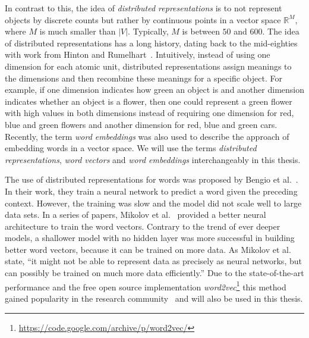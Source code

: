\documentclass[
        a4paper,
        titlepage,
        twoside,
        parskip,
        numbers=noenddot
        ]{scrbook}
\theoremstyle{break}
\begin{document}
In contrast to this, the idea of \emph{distributed representations} is to not represent objects by discrete counts but rather by continuous points in a vector space $\mathbb{R}^M$, where $M$ is much smaller than $|V|$.
Typically, $M$ is between $50$ and $600$.
The idea of distributed representations has a long history, dating back to the mid-eighties with work from Hinton and Rumelhart~\cite{Hinton1986,Rumelhart1988}.
Intuitively, instead of using one dimension for each atomic unit, distributed representations assign meanings to the dimensions and then recombine these meanings for a specific object.
For example, if one dimension indicates how green an object is and another dimension indicates whether an object is a flower, then one could represent a green flower with high values in both dimensions instead of requiring one dimension for red, blue and green flowers and another dimension for red, blue and green cars.
Recently, the term \emph{word embeddings} was also used to describe the approach of embedding words in a vector space.
We will use the terms \emph{distributed representations}, \emph{word vectors} and \emph{word embeddings} interchangeably in this thesis.

The use of distributed representations for words was proposed by Bengio et al.~\cite{Bengio2003}.
In their work, they train a neural network to predict a word given the preceding context.
However, the training was slow and the model did not scale well to large data sets.
In a series of papers, Mikolov et al.~\cite{Mikolov2013b,Mikolov2013,Mikolov2013a} provided a better neural architecture to train the word vectors.
Contrary to the trend of ever deeper models, a shallower model with no hidden layer was more successful in building better word vectors, because it can be trained on more data.
As Mikolov et al.~\cite{Mikolov2013a} state, ``it might not be able to represent data as precisely as neural networks, but can possibly be trained on much more data efficiently.''
Due to the state-of-the-art performance and the free open source implementation \emph{word2vec}\footnote{\url{https://code.google.com/archive/p/word2vec/}} this method gained popularity in the research community~\cite{Baroni2014,Goth2016,Navigli2015} and will also be used in this thesis.

\end{document}

